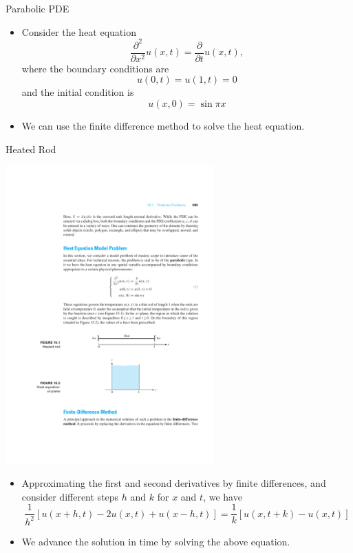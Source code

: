 \documentclass{beamer}
\begin{document}
\begin{frame}{Parabolic PDE}
    \begin{itemize}
        \item Consider the heat equation
        \[
            \frac{\partial^2}{\partial x^2} u(x, t)  =\frac{\partial}{\partial t} u(x, t), \]
            where the boundary conditions are
            \[
            u(0, t)  =u(1, t)=0 \]
            and the initial condition is 
            \[ u(x, 0)  =\sin \pi x
            \]
        \item We can use the finite difference method to solve the heat equation.
    \end{itemize}

\end{frame}
\begin{frame}{Heated Rod}
\centerline{\includegraphics[width=0.6\textwidth]{HeatedRod.pdf}}
\begin{itemize}

    \item Approximating the first and second derivatives by finite differences, and consider different steps 
    $h$ and $k$ for $x$ and $t$, we have
    \[
    \frac{1}{h^2}[u(x+h, t)-2 u(x, t)+u(x-h, t)]=\frac{1}{k}[u(x, t+k)-u(x, t)]
    \]
    \item We advance the solution in time by solving the above equation.
\end{itemize}

\end{frame}
\end{document}
